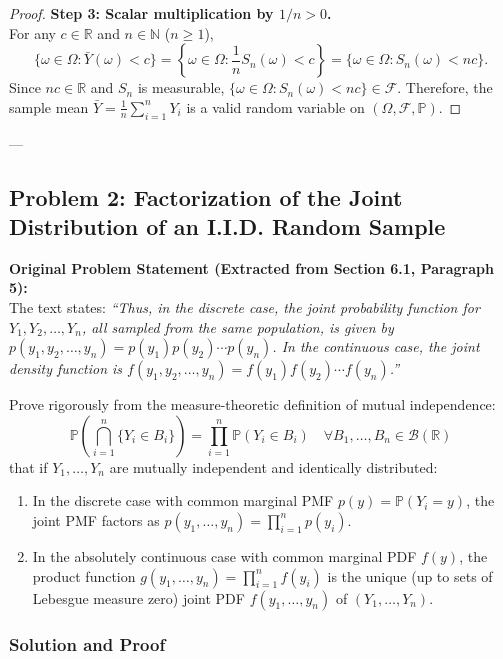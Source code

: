 \documentclass[11pt, letterpaper]{article}
\theoremstyle{definition}
\theoremstyle{remark}
\newcommand{\R}{\mathbb{R}}
\newcommand{\N}{\mathbb{N}}
\newcommand{\Prob}{\mathbb{P}}
\newcommand{\F}{\mathcal{F}}
\begin{document}
\begin{proof}
\textbf{Step 3: Scalar multiplication by $1/n > 0$.} \\ \relax
For any $c \in \R$ and $n \in \N$ ($n \ge 1$),
\[
    \{\omega \in \Omega : \bar{Y}(\omega) < c\} = \left\{\omega \in \Omega : \frac{1}{n} S_n(\omega) < c\right\} = \{\omega \in \Omega : S_n(\omega) < nc\}.
\]
Since $nc \in \R$ and $S_n$ is measurable, $\{\omega \in \Omega : S_n(\omega) < nc\} \in \F$. Therefore, the sample mean $\bar{Y} = \frac{1}{n}\sum_{i=1}^n Y_i$ is a valid random variable on $(\Omega, \F, \Prob)$.
\end{proof}

---

\subsection{Problem 2: Factorization of the Joint Distribution of an I.I.D. Random Sample}

\textbf{Original Problem Statement (Extracted from Section 6.1, Paragraph 5):} \\ \relax
The text states: \emph{``Thus, in the discrete case, the joint probability function for $Y_1, Y_2, \dots, Y_n$, all sampled from the same population, is given by $p(y_1, y_2, \dots, y_n) = p(y_1)p(y_2)\cdots p(y_n)$. In the continuous case, the joint density function is $f(y_1, y_2, \dots, y_n) = f(y_1)f(y_2)\cdots f(y_n)$.''}

Prove rigorously from the measure-theoretic definition of mutual independence:
\[
    \Prob\left(\bigcap_{i=1}^{n} \{Y_i \in B_i\}\right) = \prod_{i=1}^{n} \Prob(Y_i \in B_i) \quad \forall B_1, \dots, B_n \in \mathcal{B}(\R)
\]
that if $Y_1, \dots, Y_n$ are mutually independent and identically distributed:
\begin{enumerate}[label=(\alph*)]
    \item In the discrete case with common marginal PMF $p(y) = \Prob(Y_i = y)$, the joint PMF factors as $p(y_1, \dots, y_n) = \prod_{i=1}^n p(y_i)$.
    \item In the absolutely continuous case with common marginal PDF $f(y)$, the product function $g(y_1, \dots, y_n) = \prod_{i=1}^n f(y_i)$ is the unique (up to sets of Lebesgue measure zero) joint PDF $f(y_1, \dots, y_n)$ of $(Y_1, \dots, Y_n)$.
\end{enumerate}

\subsubsection*{Solution and Proof}
\end{document}
